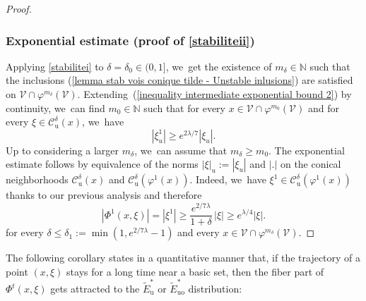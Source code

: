 \documentclass[JEP,XML,SOM,Unicode,NoEqCountersInSection,NoFloatCountersInSection,published]{cedram}
\newcommand{\ru}{\mathrm{u}}
\newcommand{\ruo}{\mathrm{uo}}
\theoremstyle{definition}
\theoremstyle{plain}
\newcommand{\Ccal}{\mathcal{C}}
\newcommand{\N}{\mathbb{N}}
\newcommand{\Vcal}{\mathcal{V}}
\begin{document}
\begin{proof}
\subsubsection*{Exponential estimate (proof of \eqref{stabiliteii})} Applying \eqref{stabilitei} to $\delta=\delta_0\in(0,1]$, we~get the existence of $m_{\delta} \in \N$ such that the inclusions (\ref{lemma stab vois conique tilde - Unstable inlusions}) are satisfied on $\Vcal \cap \varphi^{m_{\delta}} (\Vcal)$. Extending~(\ref{inequality intermediate exponential bound 2}) by continuity, we~can find $m_0 \in \N$ such that for every $x \in \Vcal \cap \varphi^{m_0} (\Vcal)$ and for every $\xi \in \Ccal_{\ru}^{\delta} (x)$, we~have
\[
|\xi_u^1| \geq e^{2\lambda / 7 } |\xi_u|.
\]
Up to considering a larger $m_{\delta}$, we~can assume that $m_{\delta} \geq m_0$. The exponential estimate follows by equivalence of the norms $|\xi |_u:= |\xi_u|$ and $|.|$ on the conical neighborhoods $\Ccal_\ru^{\delta}(x)$ and $\Ccal_\ru^{\delta}(\varphi^1(x))$. Indeed, we~have $\xi^1 \in \Ccal_\ru^{\delta} (\varphi^1 (x))$ thanks to our previous analysis and therefore
\[
|\Phi^1 (x,\xi)| = |\xi^1| \geq \frac{e^{2/7\lambda}}{1 + \delta}\, |\xi| \geq e^{\lambda /4} |\xi|.
\]
for every $\delta \leq \delta_1:= \min (1, e^{2/7\lambda} - 1)$ and every $x \in \Vcal \cap \varphi^{m_{\delta}} (\Vcal)$.
\end{proof}

The following corollary states in a quantitative manner that, if the trajectory of a point $(x,\xi)$ stays for a long time near a basic set, then the fiber part of $\Phi^t (x,\xi)$ gets attracted to the $\widetilde{E}_\ru^*$ or $\widetilde{E}_{\ruo}^*$ distribution:
\end{document}
